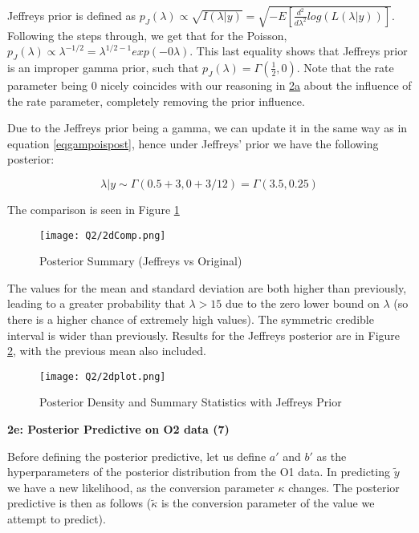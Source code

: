 \documentclass{article}
\begin{document}
Jeffreys prior is defined as $p_J(\lambda) \propto \sqrt{I(\lambda | y)} = \sqrt{-E\left[\frac{d^2}{d\lambda^2} log(L(\lambda | y))\right]}$. Following the steps through, we get that for the Poisson, $p_J(\lambda) \propto \lambda^{-1/2} = \lambda^{1/2 - 1}exp(-0\lambda)$. This last equality shows that Jeffreys prior is an improper gamma prior, such that $p_J(\lambda) = \Gamma(\frac{1}{2},0)$. Note that the rate parameter being 0 nicely coincides with our reasoning in \hyperref[sec:2a]{2a} about the influence of the rate parameter, completely removing the prior influence.  

Due to the Jeffreys prior being a gamma, we can update it in the same way as in equation \eqref{eqgampoispost}, hence under Jeffreys' prior we have the following posterior:

\vspace{-3.5mm}

\begin{equation}
\lambda | y \sim \Gamma(0.5 + 3, 0 + 3/12) = \Gamma(3.5, 0.25)
\end{equation}
 
The comparison is seen in Figure \ref{Fig2dJeffOrigComp}

\begin{figure}[!h]
\centering
\texttt{[image: Q2/2dComp.png]}
\caption{Posterior Summary (Jeffreys vs Original)} \label{Fig2dJeffOrigComp}
\end{figure}

The values for the mean and standard deviation are both higher than previously, leading to a greater probability that $\lambda > 15$ due to the zero lower bound on $\lambda$ (so there is a higher chance of extremely high values). The symmetric credible interval is wider than previously. Results for the Jeffreys posterior are in Figure \ref{Fig2d}, with the previous mean also included.

\begin{figure}[!h]
\centering
\texttt{[image: Q2/2dplot.png]} \vspace{-5mm}
\caption{Posterior Density and Summary Statistics with Jeffreys Prior} \label{Fig2d}
\end{figure}


%
%
%
%
%
%
%
%


\textbf{2e: Posterior Predictive on O2 data (7)} \label{sec:2e}

Before defining the posterior predictive, let us define $a'$ and $b'$ as the hyperparameters of the posterior distribution from the O1 data. In predicting $\tilde{y}$ we have a new likelihood, as the conversion parameter $\kappa$ changes. The posterior predictive is then as follows ($\tilde{\kappa}$ is the conversion parameter of the value we attempt to predict). 
\end{document}

